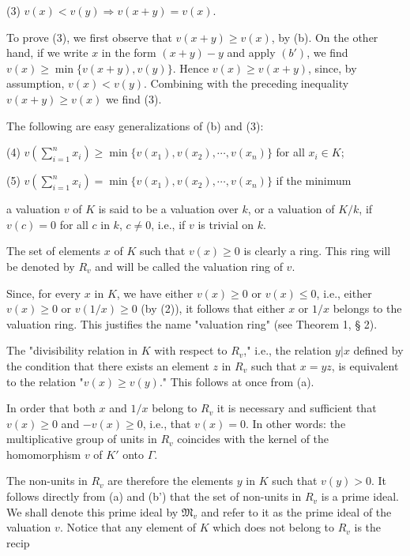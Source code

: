 (3) $v(x) < v(y) \Rightarrow v(x+y) = v(x)$.

To prove (3), we first observe that $v(x+y) \geq v(x)$, by (b). On the other hand, if we write $x$ in the form $(x+y) - y$ and apply $(b')$, we find $v(x) \geq \min \{v(x+y), v(y)\}$. Hence $v(x) \geq v(x+y)$, since, by assumption, $v(x) < v(y)$. Combining with the preceding inequality $v(x+y) \geq v(x)$ we find (3).

The following are easy generalizations of (b) and (3):

(4) $v\left(\sum_{i=1}^{n} x_i\right) \geq \min \{v(x_1), v(x_2), \cdots, v(x_n)\}$ for all $x_i \in K$;

(5) $v\left(\sum_{i=1}^{n} x_i\right) = \min \{v(x_1), v(x_2), \cdots, v(x_n)\}$ if the minimum

a valuation $v$ of $K$ is said to be a valuation over $k$, or a valuation of $K/k$, if $v(c) = 0$ for all $c$ in $k$, $c \neq 0$, i.e., if $v$ is trivial on $k$.

The set of elements $x$ of $K$ such that $v(x) \geq 0$ is clearly a ring. This ring will be denoted by $R_v$ and will be called the valuation ring of $v$.

Since, for every $x$ in $K$, we have either $v(x) \geq 0$ or $v(x) \leq 0$, i.e., either $v(x) \geq 0$ or $v(1/x) \geq 0$ (by (2)), it follows that either $x$ or $1/x$ belongs to the valuation ring. This justifies the name "valuation ring" (see Theorem 1, § 2).

The "divisibility relation in $K$ with respect to $R_v$," i.e., the relation $y|x$ defined by the condition that there exists an element $z$ in $R_v$ such that $x = yz$, is equivalent to the relation "$v(x) \geq v(y)$." This follows at once from (a).

In order that both $x$ and $1/x$ belong to $R_v$ it is necessary and sufficient that $v(x) \geq 0$ and $-v(x) \geq 0$, i.e., that $v(x) = 0$. In other words: the multiplicative group of units in $R_v$ coincides with the kernel of the homomorphism $v$ of $K'$ onto $\Gamma$.

The non-units in $R_v$ are therefore the elements $y$ in $K$ such that $v(y) > 0$. It follows directly from (a) and (b') that the set of non-units in $R_v$ is a prime ideal. We shall denote this prime ideal by $\mathfrak{M}_v$ and refer to it as the prime ideal of the valuation $v$. Notice that any element of $K$ which does not belong to $R_v$ is the recip